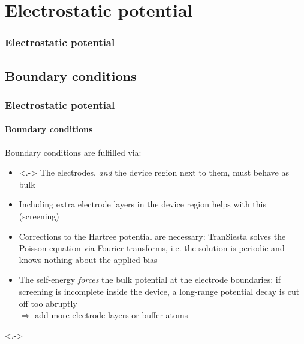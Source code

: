 \section{Electrostatic potential}

\begin{framenologo}
  \frametitle{Electrostatic potential}
  \tableofcontents[currentsection]
\end{framenologo}

\subsection{Boundary conditions}

\begin{frame}
  \frametitle{Electrostatic potential}
  \framesubtitle{Boundary conditions}

  Boundary conditions are fulfilled via:
  \begin{itemize}[<+->]
    \item<.-> The electrodes, \emph{and} the device region next to them, must behave as
    bulk

    \item Including extra electrode layers in the device region helps with this
    (screening)

    \item Corrections to the Hartree potential are necessary: TranSiesta solves the
    Poisson equation via Fourier transforms, i.e. the solution is periodic and knows
    nothing about the applied bias

    \item The self-energy \emph{forces} the bulk potential at the electrode boundaries:
    if screening is incomplete inside the device, a long-range potential decay is cut off
    too abruptly\\
    $\Rightarrow$ add more electrode layers or buffer atoms

  \end{itemize}

  \uncover<.->{
  \begin{center}

\end{center}}
\end{frame}
